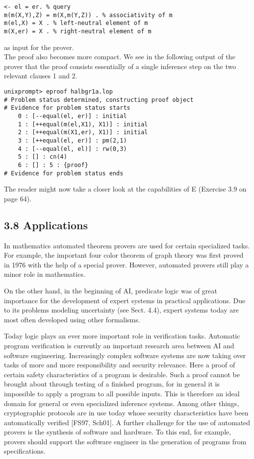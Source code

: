 \documentclass[10pt]{article}
\begin{document}
\begin{verbatim}
<- el = er. % query
m(m(X,Y),Z) = m(X,m(Y,Z)) . % associativity of m
m(el,X) = X . % left-neutral element of m
m(X,er) = X . % right-neutral element of m
\end{verbatim}

as input for the prover.\\
The proof also becomes more compact. We see in the following output of the prover that the proof consists essentially of a single inference step on the two relevant clauses 1 and 2.

\begin{verbatim}
unixprompt> eproof halbgr1a.lop
# Problem status determined, constructing proof object
# Evidence for problem status starts
    0 : [--equal(el, er)] : initial
    1 : [++equal(m(el,X1), X1)] : initial
    2 : [++equal(m(X1,er), X1)] : initial
    3 : [++equal(el, er)] : pm(2,1)
    4 : [--equal(el, el)] : rw(0,3)
    5 : [] : cn(4)
    6 : [] : 5 : {proof}
# Evidence for problem status ends
\end{verbatim}

The reader might now take a closer look at the capabilities of E (Exercise 3.9 on page 64).

\subsection*{3.8 Applications}
In mathematics automated theorem provers are used for certain specialized tasks. For example, the important four color theorem of graph theory was first proved in 1976 with the help of a special prover. However, automated provers still play a minor role in mathematics.

On the other hand, in the beginning of AI, predicate logic was of great importance for the development of expert systems in practical applications. Due to its problems modeling uncertainty (see Sect. 4.4), expert systems today are most often developed using other formalisms.

Today logic plays an ever more important role in verification tasks. Automatic program verification is currently an important research area between AI and software engineering. Increasingly complex software systems are now taking over tasks of more and more responsibility and security relevance. Here a proof of certain safety characteristics of a program is desirable. Such a proof cannot be brought about through testing of a finished program, for in general it is impossible to apply a program to all possible inputs. This is therefore an ideal domain for general or even specialized inference systems. Among other things, cryptographic protocols are in use today whose security characteristics have been automatically verified [FS97, Sch01]. A further challenge for the use of automated provers is the synthesis of software and hardware. To this end, for example, provers should support the software engineer in the generation of programs from specifications.
\end{document}

